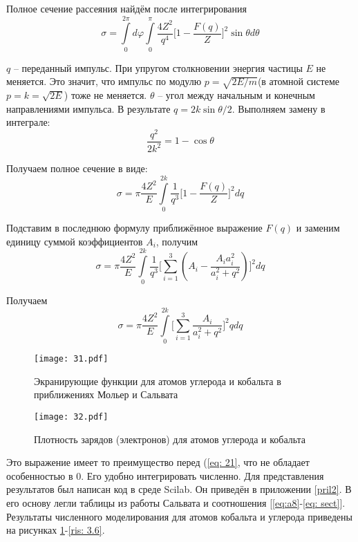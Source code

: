 \documentclass[a4paper,14pt]{extarticle} %
\begin{document}
Полное сечение рассеяния найдём после интегрирования 
\begin{equation}
\sigma =
\int\limits_0^{2\pi}
d\varphi
\int\limits_0^\pi
\frac{4Z^2}{q^4}
	\Big[
		1 - \frac{F(q)}{Z}
	\Big]^2
\sin \theta
d\theta
\end{equation}
 
$q$ -- переданный импульс. При упругом столкновении энергия частицы $E$ не меняется. Это значит, что импульс по модулю $p = \sqrt{2E/m}$(в атомной системе $p = k = \sqrt{2E}$) тоже не меняется. $\theta$ -- угол между начальным и конечным направлениями импульса. В результате $q = 2 k \sin \theta/2$. Выполняем замену в интеграле:
\begin{equation}
\frac{q^2}{2k^2} = 1-\cos \theta
\end{equation}

Получаем полное сечение в виде:
\begin{equation}
\sigma =
\pi \frac{4Z^2}{E}
\int\limits_0^{2k}
\frac{1}{q^3}
	\Big[
		1 - \frac{F(q)}{Z}
	\Big]^2
dq 
\label{eq: 21}
\end{equation}

Подставим в последнюю формулу приближённое выражение $F(q)$ и заменим единицу суммой коэффициентов $A_i$, получим
\begin{equation*}
\sigma =
\pi \frac{4Z^2}{E}
\int\limits_0^{2k}
\frac{1}{q^3}
	\Big[
		\sum_{i=1}^3 \left( A_i - \frac{A_ia_i^2}{a_i^2+q^2} \right)
	\Big]^2
dq
\end{equation*}

Получаем
\begin{equation}
\sigma =
\pi \frac{4Z^2}{E}
\int\limits_0^{2k}
	\Big[
		\sum_{i=1}^3 \frac{A_i}{a_i^2+q^2}
	\Big]^2 q
dq \label{eq: sect}
\end{equation}

	\begin{figure}[h!]
	\centering
	\caption{Экранирующие функции для атомов углерода и кобальта в приближениях Мольер и Сальвата}
	\label{ris: 3.1}
	\texttt{[image: 31.pdf]}
	\end{figure}
	
	\begin{figure}[h!]
		\centering
		\caption{Плотность зарядов (электронов) для атомов углерода и кобальта}
		\label{ris: 3.2}
		\texttt{[image: 32.pdf]}
	\end{figure}
	\newpage

Это выражение имеет то преимущество перед (\ref{eq: 21}, что не обладает особенностью в 0. Его удобно интегрировать численно. Для представления результатов был написан код в среде Scilab. Он приведён в приложении \ref{pril2}. В его основу легли таблицы из работы Сальвата \cite{Salvat} и соотношения [\ref{eq:a8}-\ref{eq: sect}]. Результаты численного моделирования для атомов кобальта и углерода приведены на рисунках \ref{ris: 3.1}-\ref{ris: 3.6}.
\end{document}
